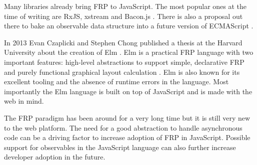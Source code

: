 Many libraries already bring FRP to JavaScript. The most popular ones at the time of writing are RxJS, xstream and Bacon.js \cite{intro-reactive}. There is also a proposal out there to bake an observable data structure into a future version of ECMAScript \cite{tc39}.

In 2013 Evan Czaplicki and Stephen Chong published a thesis at the Harvard University about the creation of Elm \cite{elm}. Elm is a practical FRP language with two important features: high-level abstractions to support simple, declarative FRP and purely functional graphical layout calculation \cite{elm}. Elm is also known for its excellent tooling and the absence of runtime errors in the language. Most importantly the Elm language is built on top of JavaScript and is made with the web in mind.

The FRP paradigm has been around for a very long time but it is still very new to the web platform. The need for a good abstraction to handle asynchronous code can be a driving factor to increase adoption of FRP in JavaScript. Possible support for observables in the JavaScript language can also further increase developer adoption in the future.


